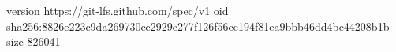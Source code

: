 version https://git-lfs.github.com/spec/v1
oid sha256:8826e223c9da269730ce2929e277f126f56ce194f81ea9bbb46dd4bc44208b1b
size 826041
